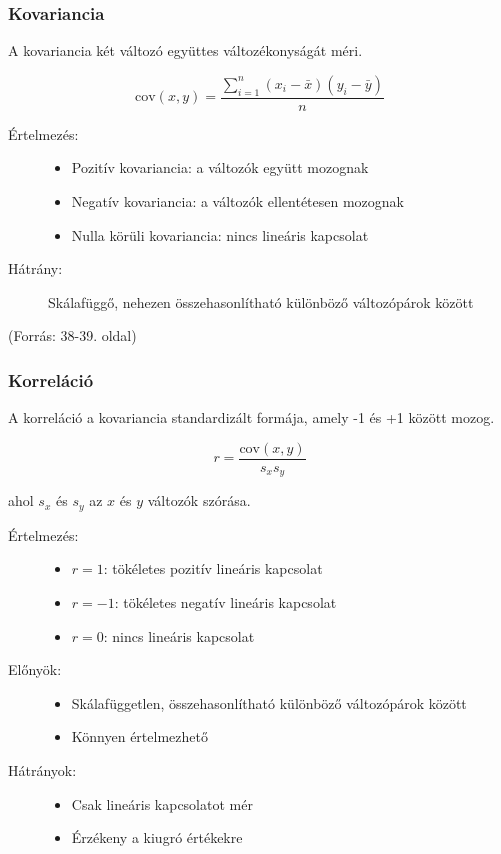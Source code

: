 \documentclass[a4paper,12pt]{article}
\begin{document}
\subsubsection{Kovariancia}

A kovariancia két változó együttes változékonyságát méri.

\begin{equation}
\text{cov}(x,y) = \frac{\sum_{i=1}^n (x_i - \bar{x})(y_i - \bar{y})}{n}
\end{equation}

\begin{description}
\item[Értelmezés:]
\begin{itemize}
    \item Pozitív kovariancia: a változók együtt mozognak
    \item Negatív kovariancia: a változók ellentétesen mozognak
    \item Nulla körüli kovariancia: nincs lineáris kapcsolat
\end{itemize}
\item[Hátrány:] Skálafüggő, nehezen összehasonlítható különböző változópárok között
\end{description}

(Forrás: 38-39. oldal)

\subsubsection{Korreláció}

A korreláció a kovariancia standardizált formája, amely -1 és +1 között mozog.

\begin{equation}
r = \frac{\text{cov}(x,y)}{s_x s_y}
\end{equation}

ahol $s_x$ és $s_y$ az $x$ és $y$ változók szórása.

\begin{description}
\item[Értelmezés:]
\begin{itemize}
    \item $r = 1$: tökéletes pozitív lineáris kapcsolat
    \item $r = -1$: tökéletes negatív lineáris kapcsolat
    \item $r = 0$: nincs lineáris kapcsolat
\end{itemize}
\item[Előnyök:]
\begin{itemize}
    \item Skálafüggetlen, összehasonlítható különböző változópárok között
    \item Könnyen értelmezhető
\end{itemize}
\item[Hátrányok:]
\begin{itemize}
    \item Csak lineáris kapcsolatot mér
    \item Érzékeny a kiugró értékekre
\end{itemize}
\end{description}
\end{document}
